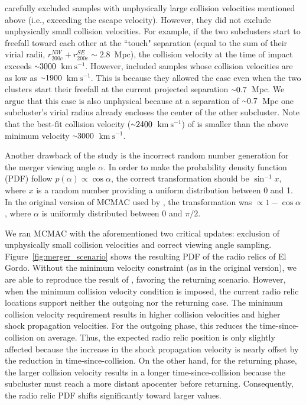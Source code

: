 \documentclass[twocolumn]{aastex631}
\newcommand{\elgordo}{El Gordo}
\newcommand{\mytilde}{\raise.19ex\hbox{$\scriptstyle\sim$}}
\newcommand{\kms}{$\mbox{km}~\mbox{s}^{-1}$}
\begin{document}
\cite{Ng2015} carefully excluded samples with unphysically large collision velocities mentioned above (i.e., exceeding the escape velocity). 
However, they did not exclude unphysically small collision velocities. For example, if the two subclusters start to freefall toward each other at the ``touch" separation (equal to the sum of their virial radii, $r^{NW}_{200c}+r^{SE}_{200c}\sim2.8$~Mpc), the collision velocity at the time of impact exceeds $\mytilde3000$~\kms. 
However, \cite{Ng2015} included samples whose collision velocities are as low as $\mytilde1900$~\kms. This is because they allowed the case even when the two clusters start their freefall at the current projected separation $\mytilde0.7$~Mpc. 
We argue that this case is also unphysical because at a separation of $\mytilde0.7$~Mpc one subcluster's virial radius already encloses the center of the other subcluster. Note that the best-fit collision velocity ($\mytilde2400$~\kms) of \cite{Ng2015} is smaller than the above minimum velocity $\mytilde3000$~\kms.


Another drawback of the \cite{Ng2015} study is the incorrect random number generation for the merger viewing angle $\alpha$. 
In order to make the probability density function (PDF) follow $p(\alpha)\propto\cos \alpha$, the correct transformation should be $\sin^{-1} x$, where $x$ is a random number providing a uniform distribution between 0 and 1. 
In the original version of MCMAC used by \cite{Ng2015}, the transformation was $\propto 1-\cos \alpha$, where $\alpha$ is uniformly distributed between $0$ and $\pi/2$. 


We ran MCMAC with the aforementioned two critical updates: exclusion of unphysically small collision velocities and correct viewing angle sampling. 
Figure~\ref{fig:merger_scenario} shows the resulting PDF of the radio relics of \elgordo. Without the minimum velocity constraint (as in the original version), we are able to reproduce the result of \cite{Ng2015}, favoring the returning scenario. 
However, when the minimum collision velocity condition is imposed, the current radio relic locations support neither the outgoing nor the returning case. 
The minimum collision velocity requirement results in higher collision velocities and higher shock propagation velocities. 
For the outgoing phase, this reduces the time-since-collision on average. Thus, the expected radio relic position is only slightly affected because the increase in the shock propagation velocity is nearly offset by the reduction in time-since-collision. 
On the other hand, for the returning phase, the larger collision velocity results in a longer time-since-collision because the subcluster must reach a more distant apocenter before returning. 
Consequently, the radio relic PDF shifts significantly toward larger values.
\end{document}
